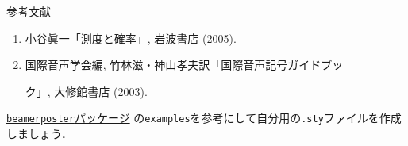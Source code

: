 \documentclass[unicode,colorlinks]{beamer}
\begin{document}
\begin{frame}[fragile]
\begin{columns}[t]
\begin{column}{.32\linewidth}
        \begin{block}{参考文献}
            \begin{enumerate}
                \item 小谷眞一「測度と確率」, 岩波書店 (2005).
                \item 国際音声学会編, 竹林滋・神山孝夫訳「国際音声記号ガイドブッ

                    ク」, 大修館書店 (2003).
            \end{enumerate}
        \end{block}

        \href{https://github.com/deselaers/latex-beamerposter}{\texttt{beamerposter}パッケージ}
        の\texttt{examples}を参考にして自分用の\texttt{.sty}ファイルを作成しましょう．
    \end{column}
\end{columns}
\end{frame}
\end{document}
